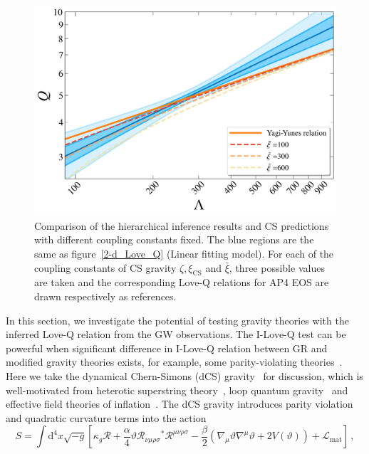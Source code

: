 \documentclass[a4paper,11pt]{article}
\begin{document}
\begin{figure}[htbp]
\begin{minipage}{0.48\linewidth}
    \end{minipage}
    \vspace{3mm}
    \begin{minipage}{0.48\linewidth}
        \includegraphics[width=\linewidth]{CS_xi_bar_AP4_2d.pdf}
    \end{minipage}
    \caption{Comparison of the hierarchical inference results and CS predictions with different coupling constants fixed. The blue regions are the same as figure~\ref{2-d_Love_Q} (Linear fitting model). For each of the coupling constants of CS gravity $\zeta, \xi_{\mathrm{CS}}$ and $\bar\xi$, three possible values are taken and the corresponding Love-Q relations for AP4 EOS are drawn respectively as references.}
    \label{cs_Love_Q}
\end{figure}
In this section, we investigate the potential of testing gravity theories with
the inferred Love-Q relation from the GW observations.
The I-Love-Q test can be powerful when significant difference in I-Love-Q
relation between GR and modified gravity theories exists, for example, some
parity-violating theories~\cite{Yagi_2017, Yunes:2025xwp}. Here we take the
dynamical Chern-Simons (dCS) gravity~\cite{Jackiw:2003pm, Smith:2007jm,
Alexander:2009tp} for discussion, which is well-motivated from heterotic superstring
theory~\cite{Polchinski:1998rq, Polchinski:1998rr}, loop quantum
gravity~\cite{Alexander:2004xd, Taveras:2008yf, Calcagni:2009xz} and effective
field theories of inflation~\cite{Weinberg:2008hq}. The dCS gravity introduces parity violation and quadratic curvature terms into the action~\cite{Alexander:2009tp, Gupta:2017vsl}
\begin{equation}
   \label{cs_action}
   S = \int \mathrm{d}^4 x \sqrt{-g}\left[ \kappa_g \mathcal{R} + \frac{\alpha}{4} \mathcal{\vartheta} \mathcal{R}_{\nu\mu\rho\sigma} {}^{*}\mathcal{R}^{\mu\nu\rho\sigma} - \frac{\beta}{2}(\nabla_{\mu}\mathcal{\vartheta}\nabla^{\mu}\mathcal{\vartheta}+2V(\mathcal{\vartheta})) + \mathcal{L}_{\mathrm{mat}}\right]\,,
\end{equation}
\end{document}
